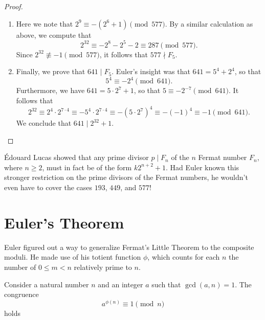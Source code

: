 \begin{proof}
\begin{enumerate}
  \item Here we note that $2^9\equiv -(2^6+1)\pmod{577}$. By a similar calculation as above, we compute that
    \begin{equation*}
      2^{32}\equiv -2^8-2^5-2\equiv 287\pmod{577}.
    \end{equation*}
    Since $2^{32}\nequiv-1\pmod{577}$, it follows that $577\nmid F_5$.
  \item Finally, we prove that $641\mid F_5$. Euler's insight was that $641=5^4+2^4$, so that
    \begin{equation*}
      5^4\equiv -2^4\pmod{641}.
    \end{equation*}
    Furthermore, we have $641=5\cdot 2^7+1$, so that $5\equiv -2^{-7}\pmod{641}$. It follows that
    \begin{equation*}
      2^{32}\equiv 2^4\cdot 2^{7\cdot 4}\equiv -5^4\cdot 2^{7\cdot 4}\equiv -(5\cdot 2^7)^4\equiv - (-1)^4\equiv -1 \pmod{641}.
    \end{equation*}
    We conclude that $641\mid 2^{32}+1$.\qedhere
  \end{enumerate}
\end{proof}

\begin{remark}
  \'Edouard Lucas showed that any prime divisor $p\mid F_n$ of the $n$\supth{} Fermat number $F_n$, where $n\geq 2$, must in fact be of the form $k2^{n+2}+1$. Had Euler known this stronger restriction on the prime divisors of the Fermat numbers, he wouldn't even have to cover the cases $193$, $449$, and $577$!
\end{remark}

\section{Euler's Theorem}

Euler figured out a way to generalize Fermat's Little Theorem to the composite moduli. He made use of his totient function $\phi$, which counts for each $n$ the number of $0\leq m<n$ relatively prime to $n$.

\begin{theorem}\label{theorem:eulers-theorem}
  Consider a natural number $n$ and an integer $a$ such that $\gcd(a,n)=1$. The congruence
  \begin{equation*}
    a^{\phi(n)}\equiv 1\pmod{n}
  \end{equation*}
  holds
\end{theorem}

